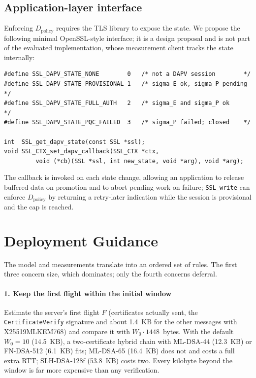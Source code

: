 \documentclass[preprint,10pt,3p]{elsarticle}
\begin{document}
\subsection{Application-layer interface}
\label{sec:api}

Enforcing $D_\text{policy}$ requires the TLS library to expose the state.
We propose the following minimal OpenSSL-style interface; it is a design
proposal and is not part of the evaluated implementation, whose
measurement client tracks the state internally:
\begin{verbatim}
#define SSL_DAPV_STATE_NONE        0   /* not a DAPV session        */
#define SSL_DAPV_STATE_PROVISIONAL 1   /* sigma_E ok, sigma_P pending */
#define SSL_DAPV_STATE_FULL_AUTH   2   /* sigma_E and sigma_P ok     */
#define SSL_DAPV_STATE_PQC_FAILED  3   /* sigma_P failed; closed    */

int  SSL_get_dapv_state(const SSL *ssl);
void SSL_CTX_set_dapv_callback(SSL_CTX *ctx,
         void (*cb)(SSL *ssl, int new_state, void *arg), void *arg);
\end{verbatim}
The callback is invoked on each state change, allowing an application to
release buffered data on promotion and to abort pending work on failure;
\texttt{SSL\_write} can enforce $D_\text{policy}$ by returning a
retry-later indication while the session is provisional and the cap is
reached.

\section{Deployment Guidance}
\label{sec:deployment}

The model and measurements translate into an ordered set of rules.  The
first three concern size, which dominates; only the fourth concerns
deferral.

\paragraph{1. Keep the first flight within the initial window}  Estimate
the server's first flight $F$ (certificates actually sent, the
\texttt{CertificateVerify} signature and about 1.4~KB for the other
messages with X25519MLKEM768) and compare it with $W_0 \cdot 1448$~bytes.
With the default $W_0 = 10$ (14.5~KB), a two-certificate hybrid chain with
ML-DSA-44 (12.3~KB) or FN-DSA-512 (6.1~KB) fits; ML-DSA-65 (16.4~KB) does
not and costs a full extra RTT; SLH-DSA-128f (53.8~KB) costs two.  Every
kilobyte beyond the window is far more expensive than any verification.
\end{document}
